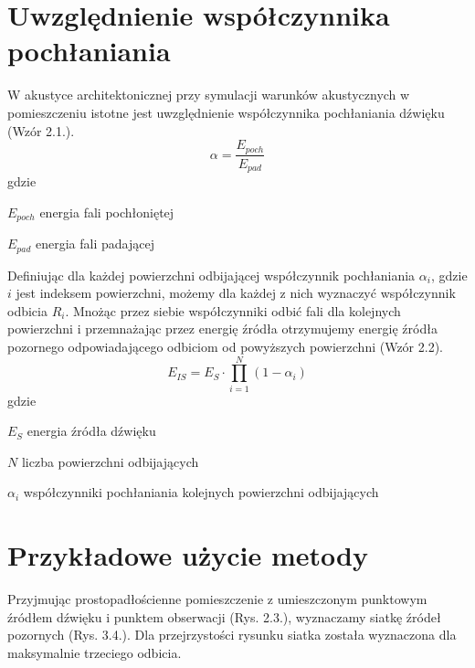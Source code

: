 
\section{Uwzględnienie współczynnika pochłaniania}\label{sec:zm}

W akustyce architektonicznej przy symulacji warunków akustycznych w pomieszczeniu istotne jest uwzględnienie współczynnika pochłaniania dźwięku (Wzór 2.1.). \\

\begin{equation}
\alpha=\frac{E_{poch}}{E_{pad}}
\end{equation}
gdzie
\begin{eqwhere}[2cm]
        \item[$E_{poch}$] energia fali pochłoniętej
        \item[$E_{pad}$] energia fali padającej
\end{eqwhere}

Definiując dla każdej powierzchni odbijającej współczynnik pochłaniania $\alpha_i$, gdzie $i$  jest indeksem powierzchni, możemy dla każdej z nich wyznaczyć współczynnik odbicia $R_i$. Mnożąc przez siebie współczynniki odbić fali dla kolejnych powierzchni i przemnażając przez energię źródła otrzymujemy energię źródła pozornego odpowiadającego odbiciom od powyższych powierzchni (Wzór 2.2). \\

\begin{equation}
E_{IS}=E_{S}\cdot\prod_{i=1}^{N}(1-\alpha_i)
\end{equation}
gdzie
\begin{eqwhere}[2cm]
        \item[$E_{S}$] energia źródła dźwięku
        \item[$N$] liczba powierzchni odbijających
        \item[$\alpha_i$] współczynniki pochłaniania kolejnych powierzchni odbijających
\end{eqwhere}


\section{Przykładowe użycie metody}\label{sec:przyuzy}

Przyjmując prostopadłościenne pomieszczenie z umieszczonym punktowym źródłem dźwięku i punktem obserwacji (Rys. 2.3.), wyznaczamy siatkę źródeł pozornych (Rys. 3.4.). Dla przejrzystości rysunku siatka została wyznaczona dla maksymalnie trzeciego odbicia.
 
